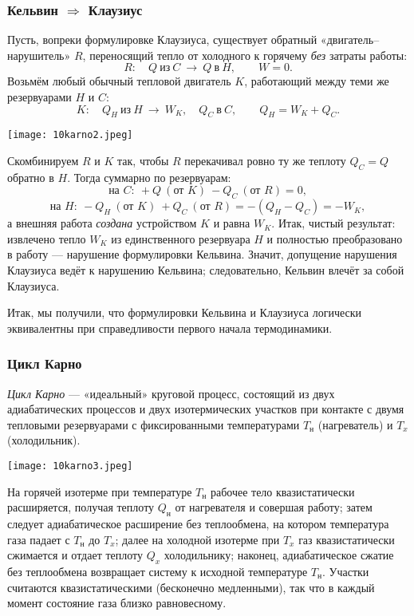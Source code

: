 \documentclass[12pt, a4paper]{article}%
\begin{document}
\subsubsection*{Кельвин $\Rightarrow$ Клаузиус}

Пусть, вопреки формулировке Клаузиуса, существует обратный «двигатель–нарушитель» $R$, переносящий тепло от холодного к горячему \emph{без} затраты работы:
\[
R:\quad Q\ \text{из}\ C \ \longrightarrow\ Q\ \text{в}\ H,\qquad W=0.
\]
Возьмём любый обычный тепловой двигатель $K$, работающий между теми же резервуарами $H$ и $C$:
\[
K:\quad Q_H\ \text{из}\ H \ \longrightarrow\ W_K,\quad Q_C\ \text{в}\ C,\qquad Q_H=W_K+Q_C.
\]

\begin{center}
\texttt{[image: 10karno2.jpeg]}
\label{fig:mpr}
\end{center}

Скомбинируем $R$ и $K$ так, чтобы $R$ перекачивал ровно ту же теплоту $Q_C = Q$ обратно в $H$. Тогда суммарно по резервуарам:
\[
\text{на } C:\ +Q\ (\text{от }K)\ -Q_C\ (\text{от }R)=0,
\]
\[
\text{на } H:\ -Q_H\ (\text{от }K)\ +Q_C\ (\text{от }R)=-(Q_H-Q_C)=-W_K,
\]
а внешняя работа \emph{создана} устройством $K$ и равна $W_K$. Итак, чистый результат: извлечено тепло $W_K$ из единственного резервуара $H$ и полностью преобразовано в работу — нарушение формулировки Кельвина. Значит, допущение нарушения Клаузиуса ведёт к нарушению Кельвина; следовательно, Кельвин влечёт за собой Клаузиуса.

Итак, мы получили, что формулировки Кельвина и Клаузиуса логически эквивалентны при справедливости первого начала термодинамики.


\subsubsection*{Цикл Карно}

\textit{Цикл Карно} — «идеальный» круговой процесс, состоящий из двух адиабатических процессов
и двух изотермических участков при контакте с двумя тепловыми резервуарами с
фиксированными температурами $T_{\text{н}}$ (нагреватель) и $T_x$ (холодильник).

\begin{center}
\texttt{[image: 10karno3.jpeg]}
\label{fig:mpr}
\end{center}

На горячей изотерме при температуре $T_{\text{н}}$ рабочее тело квазистатически
расширяется, получая теплоту $Q_{\text{н}}$ от нагревателя и совершая работу;
затем следует адиабатическое расширение без теплообмена, на котором температура 
газа падает с $T_{\text{н}}$ до $T_x$; далее на холодной изотерме при 
$T_x$ газ квазистатически сжимается и отдает теплоту $Q_x$ холодильнику;
наконец, адиабатическое сжатие без теплообмена возвращает систему к исходной
температуре $T_{\text{н}}$. Участки считаются квазистатическими (бесконечно 
медленными), так что в каждый момент состояние газа близко равновесному. 
\end{document}
